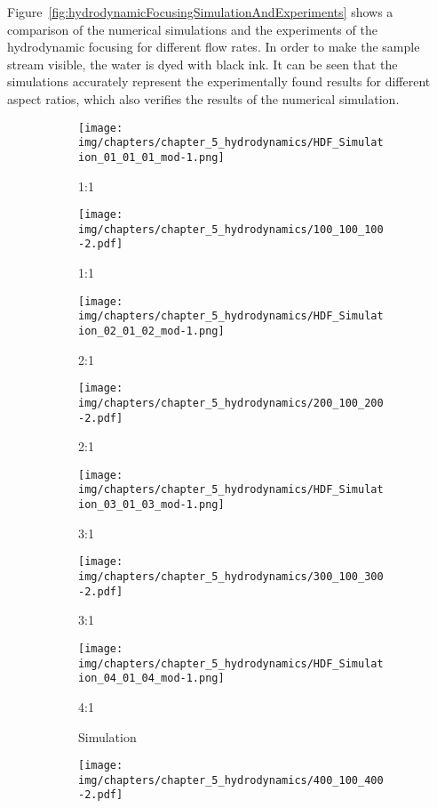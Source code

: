 Figure~\ref{fig:hydrodynamicFocusingSimulationAndExperiments} shows a comparison of the numerical simulations and the experiments of the hydrodynamic focusing for different flow rates. In order to make the sample stream visible, the water is dyed with black ink. It can be seen that the simulations accurately represent the experimentally found results for different aspect ratios, which also verifies the results of the numerical simulation.

\begin{figure}[htb!]
	\centering
	\begin{subfigure}[b]{0.4\textwidth}
				\texttt{[image: img/chapters/chapter\_5\_hydrodynamics/HDF\_Simulation\_01\_01\_01\_mod-1.png]}
				\caption{1:1}
	\end{subfigure}
	\begin{subfigure}[b]{0.4\textwidth}
				\texttt{[image: img/chapters/chapter\_5\_hydrodynamics/100\_100\_100-2.pdf]}
				\caption{1:1}
    \end{subfigure}
	\begin{subfigure}[b]{0.4\textwidth}
				\texttt{[image: img/chapters/chapter\_5\_hydrodynamics/HDF\_Simulation\_02\_01\_02\_mod-1.png]}
				\caption{2:1}
    \end{subfigure}
	\begin{subfigure}[b]{0.4\textwidth}
				\texttt{[image: img/chapters/chapter\_5\_hydrodynamics/200\_100\_200-2.pdf]}
				\caption{2:1}
    \end{subfigure}
	\begin{subfigure}[b]{0.4\textwidth}
				\texttt{[image: img/chapters/chapter\_5\_hydrodynamics/HDF\_Simulation\_03\_01\_03\_mod-1.png]}
				\caption{3:1}
    \end{subfigure}
	\begin{subfigure}[b]{0.4\textwidth}
				\texttt{[image: img/chapters/chapter\_5\_hydrodynamics/300\_100\_300-2.pdf]}
				\caption{3:1}
    \end{subfigure}
	\begin{subfigure}[b]{0.4\textwidth}
				\texttt{[image: img/chapters/chapter\_5\_hydrodynamics/HDF\_Simulation\_04\_01\_04\_mod-1.png]}
				\caption{4:1}
				\caption*{Simulation}
    \end{subfigure}                        
	\begin{subfigure}[b]{0.4\textwidth}
				\texttt{[image: img/chapters/chapter\_5\_hydrodynamics/400\_100\_400-2.pdf]}

\end{subfigure}
\end{figure}
